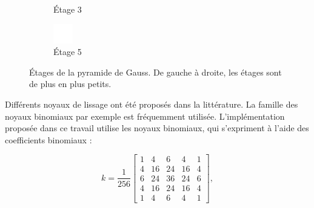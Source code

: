 \begin{figure}[h]
\begin{subfigure}{.3\textwidth}
        \caption{Étage 3}
    \end{subfigure}
    \hfill
    \begin{subfigure}{.3\textwidth}
        \centering
        \includegraphics[width=\textwidth]{contenu/resources/images/gauss_5}
        \caption{Étage 5}
    \end{subfigure}

    \caption[Étages de la pyramide de Gauss]{Étages de la pyramide de Gauss. De gauche à droite, les étages sont de plus en plus petits.}
    \label{fig:gaussian-pyramid}
\end{figure}

Différents noyaux de lissage ont été proposés dans la littérature. La famille des noyaux binomiaux par exemple est fréquemment utilisée. L'implémentation proposée dans ce travail utilise les noyaux binomiaux, qui s'expriment à l'aide des coefficients binomiaux :

\begin{equation}
    k = \frac{1}{256}\left[
        \begin{array}{ccccccc}
            1 & 4 & 6 & 4 & 1 \\
            4 & 16 & 24 & 16 & 4 \\
            6 & 24 & 36 & 24 & 6 \\
            4 & 16 & 24 & 16 & 4 \\
            1 & 4 & 6 & 4 & 1
        \end{array}
    \right],
\end{equation}

